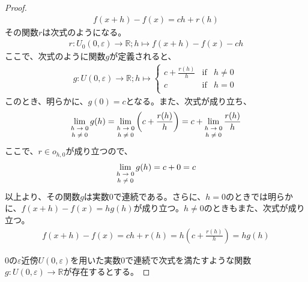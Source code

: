 \documentclass[dvipdfmx]{jsarticle}
\begin{document}
\begin{proof}
\begin{align*}
f(x + h) - f(x) = ch + r(h)
\end{align*}
その関数$r$は次式のようになる。
\begin{align*}
r:U_{0}(0,\varepsilon) \rightarrow \mathbb{R};h \mapsto f(x + h) - f(x) - ch
\end{align*}
ここで、次式のように関数$g$が定義されると、
\begin{align*}
g:U(0,\varepsilon) \rightarrow \mathbb{R};h \mapsto \left\{ \begin{matrix}
c + \frac{r(h)}{h} & \mathrm{if} & h \neq 0 \\
c & \mathrm{if} & h = 0 \\
\end{matrix} \right.\ 
\end{align*}
このとき、明らかに、$g(0) = c$となる。また、次式が成り立ち、
\begin{align*}
\lim_{\scriptsize \begin{matrix}
h \rightarrow 0 \\
h \neq 0 \\
\end{matrix}}{g(h)} = \lim_{\scriptsize \begin{matrix}
h \rightarrow 0 \\
h \neq 0 \\
\end{matrix}}\left( c + \frac{r(h)}{h} \right) = c + \lim_{\scriptsize \begin{matrix}
h \rightarrow 0 \\
h \neq 0 \\
\end{matrix}}\frac{r(h)}{h}
\end{align*}
ここで、$r \in o_{h,0}$が成り立つので、
\begin{align*}
\lim_{\scriptsize \begin{matrix}
h \rightarrow 0 \\
h \neq 0 \\
\end{matrix}}{g(h)} = c + 0 = c
\end{align*}
以上より、その関数$g$は実数$0$で連続である。さらに、$h = 0$のときでは明らかに、$f(x + h) - f(x) = hg(h)$が成り立つ。$h \neq 0$のときもまた、次式が成り立つ。
\begin{align*}
f(x + h) - f(x) = ch + r(h) = h\left( c + \frac{r(h)}{h} \right) = hg(h)
\end{align*}\par
0の$\varepsilon$近傍$U(0,\varepsilon)$を用いた実数0で連続で次式を満たすような関数$g:U(0,\varepsilon) \rightarrow \mathbb{R}$が存在するとする。

\end{proof}
\end{document}
